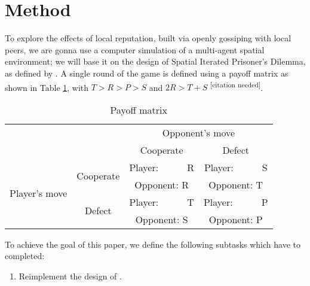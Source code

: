 \documentclass[english]{article}
\newcommand{\citationneeded}{\textsuperscript{\color{blue} [citation needed]}}
\begin{document}
\section*{Method}
To explore the effects of local reputation, built via openly gossiping with local peers, we are gonna use a computer simulation of a multi-agent spatial environment; we will base it on the design of Spatial Iterated Prisoner’s Dilemma, as defined by \citet{smaldino}.
A single round of the game is defined using a payoff matrix as shown in Table \ref{table:payoff}, with $T > R > P > S$ and $2R > T + S$ \citationneeded.

\begin{table}[h!]
  \centering
  \begin{tabular}{c c||c|c}
    & & \multicolumn{2}{c}{Opponent's move} \\
    & & Cooperate & Defect \\
    \hline\hline

    \multirow{4}{6em}{Player's move}
    & \multirow{2}{5em}{Cooperate}
      & Player:\ \ \ \ \ \ R & Player:\ \ \ \ \ \ S \\
    & & Opponent: R & Opponent: T \\
    \cline{2-4}
    & \multirow{2}{5em}{Defect}
      & Player:\ \ \ \ \ \ T & Player:\ \ \ \ \ \ P \\
    & & Opponent: S & Opponent: P \\
  \end{tabular}

  \caption{Payoff matrix}
  \label{table:payoff}
\end{table}



To achieve the goal of this paper, we define the following subtasks which have to completed:
\begin{enumerate}
  \item Reimplement the design of \citet{smaldino}.
\end{enumerate}

\end{document}

